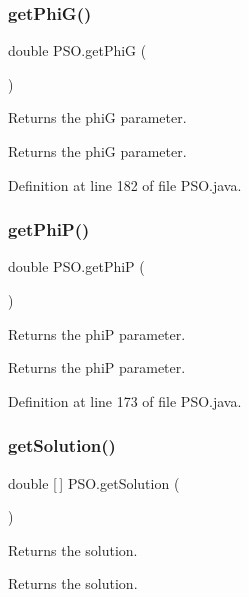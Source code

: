 \subsubsection{\texorpdfstring{get\+Phi\+G()}{getPhiG()}}
{\footnotesize\ttfamily double P\+S\+O.\+get\+PhiG (\begin{DoxyParamCaption}{ }\end{DoxyParamCaption})}

Returns the phiG parameter. \begin{DoxyReturn}{Returns}
the phiG parameter. 
\end{DoxyReturn}


Definition at line 182 of file P\+S\+O.\+java.

\mbox{\label{class_p_s_o_a51bdbe662e545c50ac984abdba9f6448}} 
\subsubsection{\texorpdfstring{get\+Phi\+P()}{getPhiP()}}
{\footnotesize\ttfamily double P\+S\+O.\+get\+PhiP (\begin{DoxyParamCaption}{ }\end{DoxyParamCaption})}

Returns the phiP parameter. \begin{DoxyReturn}{Returns}
the phiP parameter. 
\end{DoxyReturn}


Definition at line 173 of file P\+S\+O.\+java.

\mbox{\label{class_p_s_o_af3fe18f93011219d7fc3badc9220b54b}} 
\subsubsection{\texorpdfstring{get\+Solution()}{getSolution()}}
{\footnotesize\ttfamily double \mbox{[}$\,$\mbox{]} P\+S\+O.\+get\+Solution (\begin{DoxyParamCaption}{ }\end{DoxyParamCaption})}

Returns the solution. \begin{DoxyReturn}{Returns}
the solution. 
\end{DoxyReturn}


